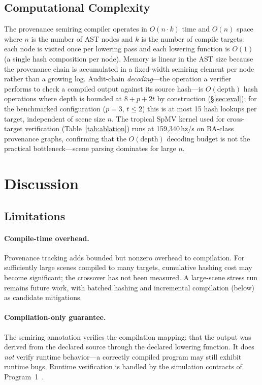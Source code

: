 \documentclass[sigconf,nonacm]{acmart}
\begin{document}
\subsection{Computational Complexity}
\label{sec:complexity}

The provenance semiring compiler operates in $O(n \cdot k)$ time and $O(n)$
space where $n$ is the number of AST nodes and $k$ is the number of compile
targets: each node is visited once per lowering pass and each lowering function
is $O(1)$ (a single hash composition per node). Memory is linear in the AST
size because the provenance chain is accumulated in a fixed-width semiring
element per node rather than a growing log. Audit-chain \emph{decoding}---the
operation a verifier performs to check a compiled output against its source
hash---is $O(\text{depth})$ hash operations where depth is bounded at
$8{+}p{+}2t$ by construction (\S\ref{sec:eval}); for the benchmarked
configuration ($p{=}3$, $t{\leq}2$) this is at most 15 hash lookups per
target, independent of scene size $n$. The tropical SpMV kernel used for
cross-target verification (Table~\ref{tab:ablation}) runs at 159{,}340\,hz/s
on BA-class provenance graphs, confirming that the $O(\text{depth})$ decoding
budget is not the practical bottleneck---scene parsing dominates for large $n$.

\section{Discussion}
\label{sec:discussion}

\subsection{Limitations}

\paragraph{Compile-time overhead.}
Provenance tracking adds bounded but nonzero overhead to compilation. For
sufficiently large scenes compiled to many targets, cumulative hashing cost may
become significant; the crossover has not been measured. A large-scene stress
run remains future work, with batched hashing and incremental compilation
(below) as candidate mitigations.

\paragraph{Compilation-only guarantee.}
The semiring annotation verifies the compilation mapping:
that the output was derived from the declared source through
the declared lowering function. It does \emph{not} verify
runtime behavior---a correctly compiled program may still
exhibit runtime bugs. Runtime verification is handled by
the simulation contracts of
Program~1~\cite{trustbyconstruction2026}.
\end{document}
